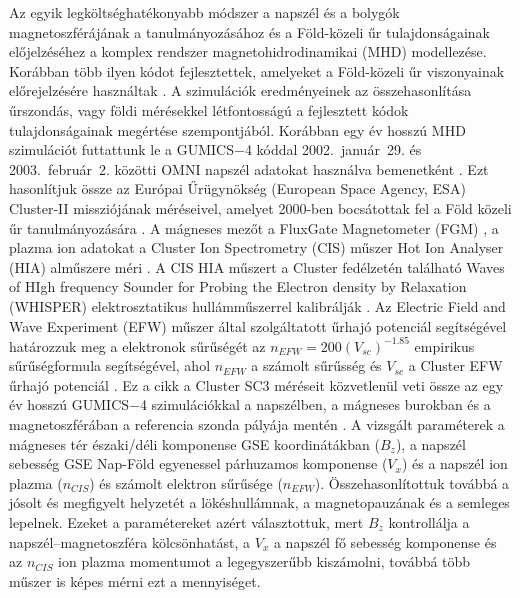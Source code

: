 \documentclass[b5paper,10pt]{article}
\begin{document}
Az egyik legköltséghatékonyabb módszer a napszél és a bolygók magnetoszférájának a tanulmányozásához és a Föld-közeli űr tulajdonságainak előjelzéséhez a komplex rendszer magnetohidrodinamikai (MHD) modellezése. Korábban több ilyen kódot fejlesztettek, amelyeket a Föld-közeli űr viszonyainak előrejelzésére használtak \cite{facsko21:_compar_gumic_terres_magnet_clust_measur}. A szimulációk eredményeinek az összehasonlítása űrszondás, vagy földi mérésekkel létfontosságú a fejlesztett kódok tulajdonságainak megértése szempontjából. Korábban egy év hosszú MHD szimulációt futtattunk le a GUMICS$-$4 kóddal 2002.~január~29. és 2003.~február~2. közötti OMNI napszél adatokat használva bemenetként \citep{facsko16:_one_earth}. Ezt hasonlítjuk össze az Európai Űrügynökség (European Space Agency, ESA) Cluster-II missziójának méréseivel, amelyet 2000-ben bocsátottak fel a Föld közeli űr tanulmányozására \cite{escoubet01:_introd_clust}. A mágneses mezőt a FluxGate Magnetometer (FGM) \cite{balogh01:_clust_magnet_field_inves}, a plazma ion adatokat a Cluster Ion Spectrometry (CIS) műszer Hot Ion Analyser (HIA) alműszere méri \citep{reme01:_first_earth_clust_cis}. A CIS HIA műszert a Cluster fedélzetén található Waves of HIgh frequency Sounder for Probing the Electron density by Relaxation (WHISPER) elektrosztatikus hullámműszerrel kalibrálják \cite{trotignon10:_whisp_relax_sound_clust_activ_archiv,blagau14:_in_hot_ion_analy_clust}. Az E\-lec\-tric Field and Wave Experiment (EFW) műszer \cite{gustafsson01:_first_clust_efw} által szolgáltatott űrhajó potenciál segítségével határozzuk meg a elektronok sűrűségét az $n_{EFW}=200(V_{sc})^{-1.85}$ empirikus sűrűségformula segítségével, ahol $n_{EFW}$ a számolt sűrűsség és $V_{sc}$ a Cluster EFW űrhajó potenciál \cite{trotignon10:_whisp_relax_sound_clust_activ_archiv,trotignon11:_calib_repor_whisp_measur_clust}. Ez a cikk a Cluster SC3 méréseit közvetlenül veti össze az egy év hosszú GUMICS$-$4 szimulációkkal a napszélben, a mágneses burokban és a magnetoszférában a referencia szonda pályája mentén \cite{facsko16:_one_earth}. A vizsgált paraméterek a mágneses tér északi/déli komponense GSE koordinátákban ($B_{z}$), a napszél sebesség GSE Nap-Föld egyenessel párhuzamos komponense ($V_x$) és a napszél ion plazma ($n_{CIS}$) és számolt elektron sűrűsége ($n_{EFW}$). Összehasonlítottuk továbbá a jósolt és megfigyelt helyzetét a lökéshullámnak, a magnetopauzának és a semleges lepelnek. Ezeket a paramétereket azért választottuk, mert $B_z$ kontrollálja a napszél--magnetoszféra kölcsönhatást, a $V_x$ a napszél fő sebesség komponense és az $n_{CIS}$ ion plazma momentumot a legegyszerűbb kiszámolni, továbbá több műszer is képes mérni ezt a mennyiséget.
\end{document}
